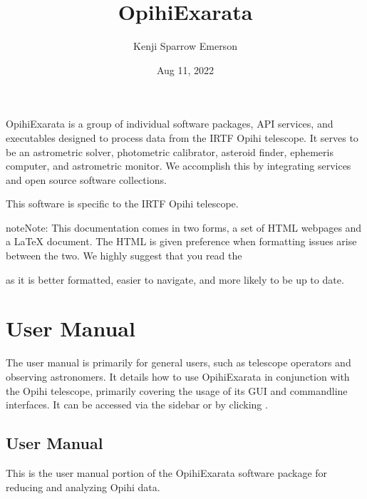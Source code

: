 \documentclass[letterpaper,11pt,english]{sphinxmanual}
\title{OpihiExarata}
\date{Aug 11, 2022}
\author{Kenji Sparrow Emerson}
\begin{document}
\pagestyle{empty}
\sphinxmaketitle
\pagestyle{plain}
\sphinxtableofcontents
\pagestyle{normal}
\label{\detokenize{index::doc}}


\sphinxAtStartPar
OpihiExarata is a group of individual software packages, API services, and
executables designed to process data from the IRTF Opihi telescope. It serves
to be an astrometric solver, photometric calibrator, asteroid finder,
ephemeris computer, and astrometric monitor. We accomplish this by integrating
services and open source software collections.

\sphinxAtStartPar
This software is specific to the IRTF Opihi telescope.

\begin{sphinxadmonition}{note}{Note:}
\sphinxAtStartPar
This documentation comes in two forms, a set of HTML webpages and a LaTeX
document. The HTML is given preference when formatting issues arise between
the two. We highly suggest that you read the
%
\begin{footnote}[1]\sphinxAtStartFootnote
{}
%
\end{footnote} as it is
better formatted, easier to navigate, and more likely to be up to date.
\end{sphinxadmonition}


\chapter{User Manual}
\label{\detokenize{index:user-manual}}\label{\detokenize{index:home-user-manual}}
\sphinxAtStartPar
The user manual is primarily for general users, such as telescope operators and
observing astronomers. It details how to use OpihiExarata in conjunction with
the Opihi telescope, primarily covering the usage of its GUI and command\sphinxhyphen{}line
interfaces. It can be accessed via the sidebar or by clicking
{\hyperref[\detokenize{user/index::doc}]{}}.

\sphinxstepscope


\section{User Manual}
\label{\detokenize{user/index:user-manual}}\label{\detokenize{user/index:user-index}}\label{\detokenize{user/index::doc}}
\sphinxAtStartPar
This is the user manual portion of the OpihiExarata software package for
reducing and analyzing Opihi data.
\end{document}
